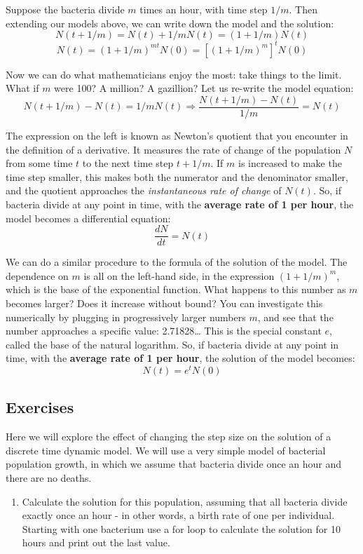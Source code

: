 \documentclass[
  letterpaper,
  DIV=11,
  numbers=noendperiod]{scrreprt}
\providecommand{\tightlist}{%
  \setlength{\itemsep}{0pt}\setlength{\parskip}{0pt}}\usepackage{longtable,booktabs,array}
\begin{document}
Suppose the bacteria divide \(m\) times an hour, with time step \(1/m\).
Then extending our models above, we can write down the model and the
solution: \[ N(t + 1/m) = N(t) + 1/m N(t) = (1+1/m) N(t) \]
\[ N(t) = (1+1/m)^{mt} N(0) = [(1+1/m)^m]^t N(0)\]

Now we can do what mathematicians enjoy the most: take things to the
limit. What if \(m\) were 100? A million? A gazillion? Let us re-write
the model equation:
\[ N(t+1/m) - N(t) = 1/m N(t) \Rightarrow \frac{N(t+1/m) - N(t) }{1/m} = N(t)\]

The expression on the left is known as Newton's quotient that you
encounter in the definition of a derivative. It measures the rate of
change of the population \(N\) from some time \(t\) to the next time
step \(t+1/m\). If \(m\) is increased to make the time step smaller,
this makes both the numerator and the denominator smaller, and the
quotient approaches the \emph{instantaneous rate of change} of \(N(t)\).
So, if bacteria divide at any point in time, with the
\textbf{average rate of 1 per hour}, the model becomes a differential
equation: \[ \frac{dN}{dt} = N(t)\]

We can do a similar procedure to the formula of the solution of the
model. The dependence on \(m\) is all on the left-hand side, in the
expression \((1+1/m)^m\), which is the base of the exponential function.
What happens to this number as \(m\) becomes larger? Does it increase
without bound? You can investigate this numerically by plugging in
progressively larger numbers \(m\), and see that the number approaches a
specific value: 2.71828\ldots{} This is the special constant \(e\),
called the base of the natural logarithm. So, if bacteria divide at any
point in time, with the \textbf{average rate of 1 per hour}, the
solution of the model becomes: \[ N(t) = e^t N(0)\]

\hypertarget{exercises-20}{%
\subsection{Exercises}\label{exercises-20}}

Here we will explore the effect of changing the step size on the
solution of a discrete time dynamic model. We will use a very simple
model of bacterial population growth, in which we assume that bacteria
divide once an hour and there are no deaths.

\begin{enumerate}
\def\labelenumi{\arabic{enumi}.}
\tightlist
\item
  Calculate the solution for this population, assuming that all bacteria
  divide exactly once an hour - in other words, a birth rate of one per
  individual. Starting with one bacterium use a for loop to calculate
  the solution for 10 hours and print out the last value.
\end{enumerate}
\end{document}
